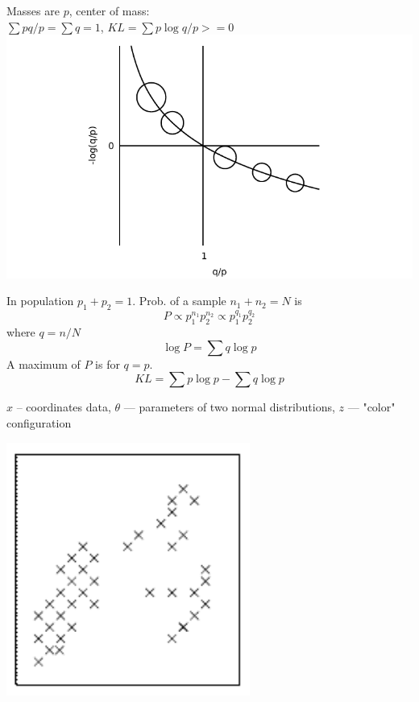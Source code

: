 \begin{center}
  Masses are $p$, center of mass: \\
  $\sum p q/p  = \sum q = 1$, $KL = \sum p \log q/p >= 0$
  \includegraphics[width=\textwidth]{i/kl.pdf}
\end{center}
\eframe


In population $p_1 + p_2 = 1$. Prob. of a sample $n_1 + n_2 = N$ is
\begin{equation*}
P \propto p_1^{n_1} p_2^{n_2} \propto p_1^{q_1} p_2^{q_2}
\end{equation*}
where $q = n / N$
\begin{equation*}
\log P = \sum q \log p
\end{equation*}
A maximum of $P$ is for $q = p$.
\begin{equation*}
KL = \sum p \log p - \sum q \log p
\end{equation*}
\eframe

$x$ -- coordinates data, $\theta$ --- parameters of two normal distributions, $z$ --- "color" configuration
\begin{center}
\includegraphics[width=0.6\textwidth]{i/km.pdf}
\end{center}
\eframe

